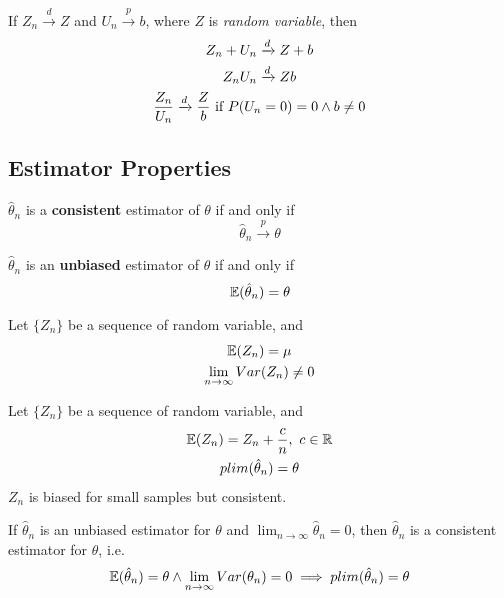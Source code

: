\documentclass[]{article}
\begin{document}
		\begin{theorem}
			If $Z_n \xrightarrow{d} Z$ and $U_n \xrightarrow{p} b$, where $Z$ is \emph{random variable}, then
			\begin{gather*}
				Z_n + U_n \xrightarrow{d} Z + b \\
				Z_n U_n \xrightarrow{d} Zb \\
				\frac{Z_n}{U_n} \xrightarrow{d} \frac{Z}{b} \text{{ if }} P(U_n = 0) = 0 \land b \neq 0
			\end{gather*}
		\end{theorem}
		
		\subsection{Estimator Properties}
			\begin{definition}
				$\hat{\theta}_n$ is a \textbf{consistent} estimator of $\theta$ if and only if
				\[
					\hat{\theta}_n \xrightarrow{p} \theta
				\]
			\end{definition}
			
			\begin{definition}
				$\hat{\theta}_n$ is an \textbf{unbiased} estimator of $\theta$ if and only if
				\[
					\mathbb{E}({\hat{\theta}_n}) = \theta
				\]
			\end{definition}
			
			\begin{example}
				Let $\{Z_n\}$ be a sequence of random variable, and
				\begin{gather*}
					\mathbb{E}({Z_n}) = \mu \\
					\lim_{n \to \infty} Var(Z_n) \neq 0
				\end{gather*}
			\end{example}
			
			\begin{example}
				Let $\{Z_n\}$ be a sequence of random variable, and
				\begin{gather*}
					\mathbb{E}({Z_n}) = Z_n + \frac{c}{n},\ c \in \mathbb{R} \\
					plim(\hat{\theta}_n) = \theta
				\end{gather*}
				$Z_n$ is biased for small samples but consistent.
			\end{example}
			
			\begin{proposition}
				If $\hat{\theta}_n$ is an unbiased estimator for $\theta$ and $\lim_{n \to \infty}{\hat{\theta}_n} = 0$, then $\hat{\theta}_n$ is a consistent estimator for $\theta$, i.e.
				\[
					\mathbb{E}({\hat{\theta}_n}) = \theta \land \lim_{n \to \infty} Var(\theta_n) = 0 \implies plim(\hat{\theta}_n) = \theta
				\]
			\end{proposition}
\end{document}
